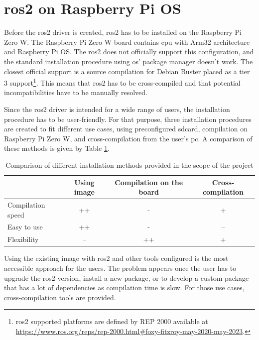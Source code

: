 \section{\ac{ros2} on Raspberry Pi OS}
Before the \ac{ros2} driver is created, \ac{ros2} has to be installed on the Raspberry Pi Zero W.
The Raspberry Pi Zero W board contains \ac{cpu} with Arm32 architecture and Raspberry Pi OS.
The \ac{ros2} does not officially support this configuration, and the standard installation procedure using \acs{os}' package manager doesn't work.
The closest official support is a source compilation for Debian Buster placed as a tier 3 support\footnote{\ac{ros2} supported platforms are defined by REP 2000 available at \url{https://www.ros.org/reps/rep-2000.html\#foxy-fitzroy-may-2020-may-2023}.}.
This means that \ac{ros2} has to be cross-compiled and that potential incompatibilities have to be manually resolved.

Since the \ac{ros2} driver is intended for a wide range of users, the installation procedure has to be user-friendly.
For that purpose, three installation procedures are created to fit different use cases, using preconfigured \ac{sdcard}, compilation on Raspberry Pi Zero W, and cross-compilation from the user's \ac{pc}.
A comparison of these methods is given by Table \ref{tab:physical:installation}.

\begin{table}[H]
    \begin{adjustwidth}{-1.5in}{-1.5in}
    \centering
    \begin{tabular}{|l|c|c|c|}
        \hline
        & \textbf{Using image} & \textbf{Compilation on the board} & \textbf{Cross-compilation} \\
        \hline
        Compilation speed & ++ & - & + \\
        \hline
        Easy to use & ++ & - & -- \\
        \hline
        Flexibility & -- & ++ & + \\
        \hline
    \end{tabular}
    \caption{Comparison of different installation methods provided in the scope of the project}
    \label{tab:physical:installation}
    \end{adjustwidth}
\end{table}

Using the existing image with \ac{ros2} and other tools configured is the most accessible approach for the users.
The problem appears once the user has to upgrade the \ac{ros2} version, install a new package, or to develop a custom package that has a lot of dependencies as compilation time is slow.
For those use cases, cross-compilation tools are provided.

